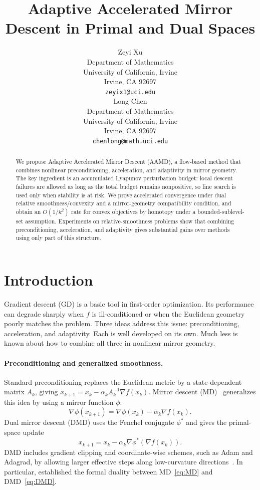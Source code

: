\documentclass{article}
\title{Adaptive Accelerated Mirror Descent in Primal and Dual Spaces}
\author{%
  Zeyi Xu \\
  Department of Mathematics\\
  University of California, Irvine\\
  Irvine, CA 92697 \\
  \texttt{zeyix1@uci.edu} \\
 \And
 Long Chen \\
 Department of Mathematics\\
  University of California, Irvine\\
  Irvine, CA 92697 \\
  \texttt{chenlong@math.uci.edu} \\
}
\theoremstyle{plain}
\theoremstyle{definition}
\theoremstyle{remark}
\begin{document}
\maketitle


\begin{abstract}
We propose Adaptive Accelerated Mirror Descent (AAMD), a flow-based method that combines nonlinear preconditioning, acceleration, and adaptivity in mirror geometry. The key ingredient is an accumulated Lyapunov perturbation budget: local descent failures are allowed as long as the total budget remains nonpositive, so line search is used only when stability is at risk. We prove accelerated convergence under dual relative smoothness/convexity and a mirror-geometry compatibility condition, and obtain an $O(1/k^2)$ rate for convex objectives by homotopy under a bounded-sublevel-set assumption. Experiments on relative-smoothness problems show that combining preconditioning, acceleration, and adaptivity gives substantial gains over methods using only part of this structure.
\end{abstract}

\section{Introduction}

Gradient descent (GD) is a basic tool in first-order optimization. Its performance can degrade sharply when $f$ is ill-conditioned or when the Euclidean geometry poorly matches the problem. Three ideas address this issue: preconditioning, acceleration, and adaptivity. Each is well developed on its own. Much less is known about how to combine all three in nonlinear mirror geometry.

\paragraph{Preconditioning and generalized smoothness.}
Standard preconditioning replaces the Euclidean metric by a state-dependent matrix $A_k$, giving
$x_{k+1}=x_k-\alpha_k A_k^{-1}\nabla f(x_k)$. Mirror descent (MD)~\citep{nemirovskij1983problem} generalizes this idea by using a mirror function $\phi$:
\begin{equation}\label{eq:MD}
\nabla \phi(x_{k+1})=\nabla \phi(x_k)-\alpha_k\nabla f(x_k).
\end{equation}
Dual mirror descent (DMD) uses the Fenchel conjugate $\phi^*$ and gives the primal-space update
\begin{equation}\label{eq:DMD}
x_{k+1}=x_k-\alpha_k\nabla \phi^*(\nabla f(x_k)).
\end{equation}
DMD includes gradient clipping and coordinate-wise schemes, such as Adam and Adagrad, by allowing larger effective steps along low-curvature directions~\citep{OikonoQuanLaudePatrin2025Nonlinearly}. In particular, \citet{maddison2021dual} established the formal duality between MD~\eqref{eq:MD} and DMD~\eqref{eq:DMD}.
\end{document}
